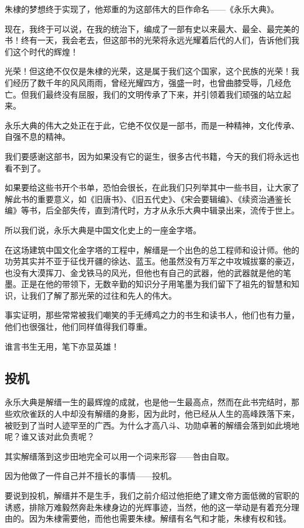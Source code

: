 \begin{multicols}{\theparacolNo}
朱棣的梦想终于实现了，他郑重的为这部伟大的巨作命名——《永乐大典》。

现在，我终于可以说，在我的统治下，编成了一部有史以来最大、最全、最完美的书！终有一天，我会老去，但这部书的光荣将永远光耀着后代的人们，告诉他们我们这个时代的辉煌！

光荣！但这绝不仅仅是朱棣的光荣，这是属于我们这个国家，这个民族的光荣！我们经历了数千年的风风雨雨，曾经光耀四方，强盛一时，也曾曲膝受辱，几经危亡。但我们最终没有屈服，我们的文明传承了下来，并引领着我们顽强的站立起来。

永乐大典的伟大之处正在于此，它绝不仅仅是一部书，而是一种精神，文化传承、自强不息的精神。

我们要感谢这部书，因为如果没有它的诞生，很多古代书籍，今天的我们将永远也看不到了。

如果要给这些书开个书单，恐怕会很长，在此我们只列举其中一些书目，让大家了解此书的重要意义，如《旧唐书》、《旧五代史》、《宋会要辑编》、《续资治通鉴长编》等书，后全部失传，直到清代时，方才从永乐大典中辑录出来，流传于世上。

所以我们说，永乐大典是中国文化史上的一座金字塔。

在这场建筑中国文化金字塔的工程中，解缙是一个出色的总工程师和设计师。他的功劳其实并不亚于征伐开疆的徐达、蓝玉。他虽然没有万军之中攻城拔寨的豪迈，也没有大漠挥刀、金戈铁马的风光，但他也有自己的武器，他的武器就是他的笔墨。正是在他的带领下，无数辛勤的知识分子用笔墨为我们留下了祖先的智慧和知识，让我们了解了那光荣的过往和先人的伟大。

事实证明，那些常常被我们嘲笑的手无缚鸡之力的书生和读书人，他们也有力量，他们也很强壮，他们同样值得我们尊重。

谁言书生无用，笔下亦显英雄！

\subsection{投机}
永乐大典是解缙一生的最辉煌的成就，也是他一生最高点，然而在此书完结时，那些欢欣雀跃的人中却没有解缙的身影，因为此时，他已经从人生的高峰跌落下来，被贬到了当时人迹罕至的广西。为什么才高八斗、功勋卓著的解缙会落到如此境地呢？谁又该对此负责呢？

其实解缙落到这步田地完全可以用一个词来形容——咎由自取。

因为他做了一件自己并不擅长的事情——投机。

要说到投机，解缙并不是生手，我们之前介绍过他拒绝了建文帝方面低微的官职的诱惑，排除万难毅然奔赴朱棣身边的光辉事迹，当然，他的这一举动是有着充分理由的。因为朱棣需要他，而他也需要朱棣。解缙有名气和才能，朱棣有权和钱。


\end{multicols}
